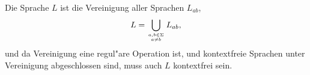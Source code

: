 \begin{loesung}
\begin{teilaufgaben}
\item
Die Sprache $L$ ist die Vereinigung aller Sprachen $L_{ab}$,
\[
L=\bigcup_{a,b\in\Sigma\atop a\ne b}L_{ab},
\]
und da Vereinigung eine regul"are Operation ist, und kontextfreie Sprachen
unter Vereinigung abgeschlossen sind, muss auch $L$ kontextfrei sein.
\end{teilaufgaben}
\end{loesung}

